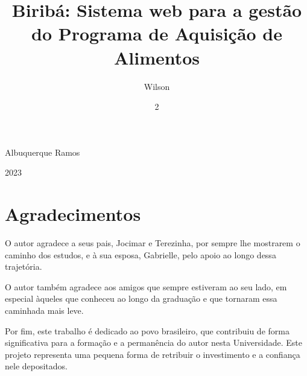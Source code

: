 \documentclass[grad,pdftex]{poli}
\begin{document}
  \title{Biribá: Sistema web para a gestão do Programa de Aquisição de Alimentos}
  \author{Wilson}{Albuquerque Ramos}
 \date{2}{2023}
  \maketitle

  \frontmatter
\clearpage{}\chapter*{Agradecimentos}


O autor agradece a seus pais, Jocimar e Terezinha, por sempre lhe mostrarem o caminho dos estudos, e à sua esposa, Gabrielle, pelo apoio ao longo dessa trajetória.


O autor também agradece aos amigos que sempre estiveram ao seu lado, em especial àqueles que conheceu ao longo da graduação e que tornaram essa caminhada mais leve.


Por fim, este trabalho é dedicado ao povo brasileiro, que contribuiu de forma significativa para a formação e a permanência do autor nesta Universidade. Este projeto representa uma pequena forma de retribuir o investimento e a confiança nele depositados.
\end{document}

